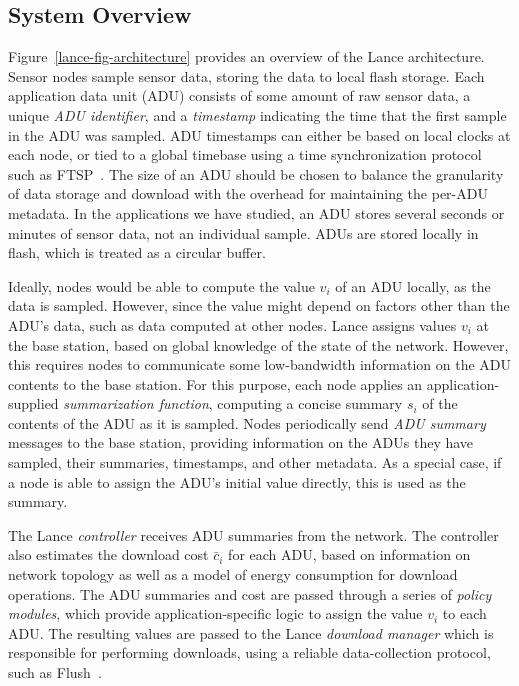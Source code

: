 \subsection{System Overview}

Figure~\ref{lance-fig-architecture} provides an overview of the Lance
architecture. Sensor nodes sample sensor data, storing the data to local
flash storage. Each application data unit (ADU) consists of some amount of
raw sensor data, a unique \textit{ADU identifier}, and a \textit{timestamp}
indicating the time that the first sample in the ADU was sampled. ADU
timestamps can either be based on local clocks at each node, or tied to a
global timebase using a time synchronization protocol such as
FTSP~\cite{ftsp}. The size of an ADU should be chosen to balance the
granularity of data storage and download with the overhead for maintaining
the per-ADU metadata. In the applications we have studied, an ADU stores
several seconds or minutes of sensor data, not an individual sample. ADUs are
stored locally in flash, which is treated as a circular buffer.

Ideally, nodes would be able to compute the value $v_i$ of an ADU locally, as
the data is sampled. However, since the value might depend on factors other
than the ADU's data, such as data computed at other nodes. Lance assigns
values $v_i$ at the base station, based on global knowledge of the state of
the network. However, this requires nodes to communicate some low-bandwidth
information on the ADU contents to the base station. For this purpose, each
node applies an application-supplied \textit{summarization function},
computing a concise summary $s_i$ of the contents of the ADU as it is
sampled. Nodes periodically send \textit{ADU summary} messages to the base
station, providing information on the ADUs they have sampled, their
summaries, timestamps, and other metadata. As a special case, if a node is
able to assign the ADU's initial value directly, this is used as the summary.

The Lance \textit{controller} receives ADU summaries from the network. The
controller also estimates the download cost $\bar{c}_i$ for each ADU, based
on information on network topology as well as a model of energy consumption
for download operations. The ADU summaries and cost are passed through a
series of \textit{policy modules}, which provide application-specific logic
to assign the value $v_i$ to each ADU. The resulting values are passed to
the Lance \textit{download manager} which is responsible for performing
downloads, using a reliable data-collection protocol, such as
Flush~\cite{flush-sensys07}.

